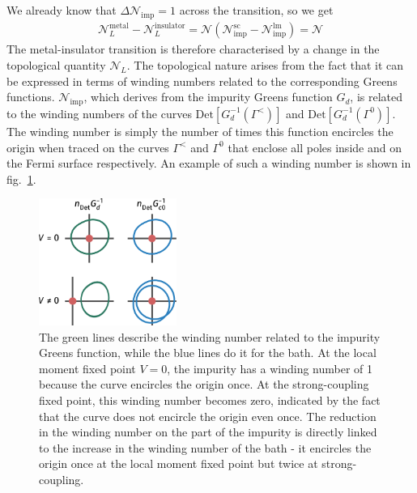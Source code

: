 \documentclass[reprint,hidelinks,onecolumn]{revtex4-2}
\begin{document}
We already know that \(\Delta \mathcal{N}_\text{imp}=1\) across the transition, so we get
\begin{equation}\begin{aligned}
	\mathcal{N}_L^\text{metal} - \mathcal{N}_L^\text{insulator} = \mathcal{N}\left(\mathcal{N}_\text{imp}^\text{sc} - \mathcal{N}_\text{imp}^\text{lm}\right) = \mathcal{N}
\end{aligned}\end{equation}
The metal-insulator transition is therefore characterised by a change in the topological quantity \(\mathcal{N}_L\). The topological nature arises from the fact that it can be expressed in terms of winding numbers related to the corresponding Greens functions. \(\mathcal{N}_\text{imp}\), which derives from the impurity Greens function \(G_d\), is related to the winding numbers of the curves \(\text{Det}[G_d^{-1}(\Gamma^<)]\) and \(\text{Det}[G_d^{-1}(\Gamma^0)]\). The winding number is simply the number of times this function encircles the origin when traced on the curves \(\Gamma^<\) and \(\Gamma^0\) that enclose all poles inside and on the Fermi surface respectively. An example of such a winding number is shown in fig.~\ref{imp_winding}.
\begin{figure}[!htb]
	\centering
	\includegraphics[width=0.4\textwidth]{windingNumbers.pdf}
	\caption{The green lines describe the winding number related to the impurity Greens function, while the blue lines do it for the bath. At the local moment fixed point \(V=0\), the impurity has a winding number of 1 because the curve encircles the origin once. At the strong-coupling fixed point, this winding number becomes zero, indicated by the fact that the curve does not encircle the origin even once. The reduction in the winding number on the part of the impurity is directly linked to the increase in the winding number of the bath - it encircles the origin once at the local moment fixed point but twice at strong-coupling.}
	\label{imp_winding}
\end{figure}
\end{document}
